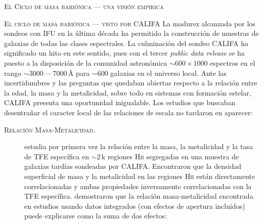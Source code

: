 \documentclass[xcolor=dvipsnames,4pt,hyperref={colorlinks,citecolor=black,linkcolor=black,urlcolor=black}]{beamer}
\begin{document}
\begin{frame}[allowframebreaks]{\textsc{El Ciclo de masa bariónica --- una visión empírica}}
%
\end{frame}

\begin{frame}[allowframebreaks]{\textsc{El ciclo de masa bariónica --- visto por CALIFA}}
%
La madurez alcanzada por los sondeos con IFU en la última década ha permitido la construcción de
muestras de galaxias de todas las clases espectrales. La culminación del sondeo CALIFA
\citep{Sanchez2012, Sanchez2016} ha significado un hito en este sentido, pues con el tercer
\emph{public data release} se ha puesto a la disposición de la comunidad astronómica
$\sim600\times1000$ espectros en el rango $\sim3000\,$---$\,7000\,$\AA{} para $\sim600$ galaxias en
el universo local.
Ante las incertidumbres y las preguntas que quedaban abiertas respecto a la relación entre la edad,
la masa y la metalicidad, sobre todo en sistemas con formación estelar, CALIFA presenta una
oportunidad inigualable. Los estudios que buscaban desentrañar el caracter local de las relaciones
de escala no tardaron en aparecer:
%
\begin{description}
%
\item[\textsc{Relación Masa-Metalicidad.}] \citet{Rosales2012} estudia por primera vez la relación
entre la masa, la metalicidad y la tasa de TFE específica en $\sim2\,$k regiones H\textsc{ii}
segregadas en una muestra de galaxias tardías sondeadas por CALIFA.
Encontraron que la densidad superficial de masa y la metalicidad en las regiones H\textsc{ii} están
directamente correlacionadas y ambas propiedades inversamente correlacionadas con la TFE específica.
\citeauthor{Rosales2012} demostraron que la relación masa-metalicidad encontrada en estudios usando
datos integrados (con efectos de apertura incluidos) puede explicarse como la suma de dos efectos:

\end{description}
\end{frame}
\end{document}
